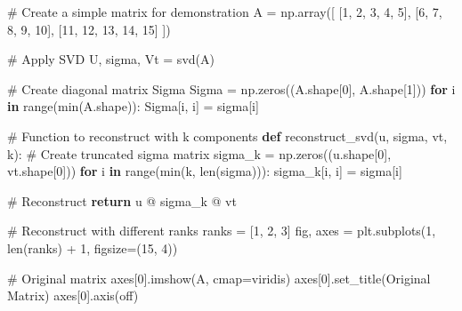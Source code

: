 \documentclass[
  letterpaper,
  DIV=11,
  numbers=noendperiod]{scrreprt}
\newenvironment{Shaded}{\begin{snugshade}}{\end{snugshade}}
\newcommand{\BuiltInTok}[1]{\textcolor[rgb]{0.00,0.23,0.31}{#1}}
\newcommand{\CommentTok}[1]{\textcolor[rgb]{0.37,0.37,0.37}{#1}}
\newcommand{\ControlFlowTok}[1]{\textcolor[rgb]{0.00,0.23,0.31}{\textbf{#1}}}
\newcommand{\DecValTok}[1]{\textcolor[rgb]{0.68,0.00,0.00}{#1}}
\newcommand{\KeywordTok}[1]{\textcolor[rgb]{0.00,0.23,0.31}{\textbf{#1}}}
\newcommand{\NormalTok}[1]{\textcolor[rgb]{0.00,0.23,0.31}{#1}}
\newcommand{\OperatorTok}[1]{\textcolor[rgb]{0.37,0.37,0.37}{#1}}
\newcommand{\StringTok}[1]{\textcolor[rgb]{0.13,0.47,0.30}{#1}}
\begin{document}
\begin{Shaded}
\begin{Highlighting}[]
\CommentTok{\# Create a simple matrix for demonstration}
\NormalTok{A }\OperatorTok{=}\NormalTok{ np.array([}
\NormalTok{    [}\DecValTok{1}\NormalTok{, }\DecValTok{2}\NormalTok{, }\DecValTok{3}\NormalTok{, }\DecValTok{4}\NormalTok{, }\DecValTok{5}\NormalTok{],}
\NormalTok{    [}\DecValTok{6}\NormalTok{, }\DecValTok{7}\NormalTok{, }\DecValTok{8}\NormalTok{, }\DecValTok{9}\NormalTok{, }\DecValTok{10}\NormalTok{],}
\NormalTok{    [}\DecValTok{11}\NormalTok{, }\DecValTok{12}\NormalTok{, }\DecValTok{13}\NormalTok{, }\DecValTok{14}\NormalTok{, }\DecValTok{15}\NormalTok{]}
\NormalTok{])}

\CommentTok{\# Apply SVD}
\NormalTok{U, sigma, Vt }\OperatorTok{=}\NormalTok{ svd(A)}

\CommentTok{\# Create diagonal matrix Sigma}
\NormalTok{Sigma }\OperatorTok{=}\NormalTok{ np.zeros((A.shape[}\DecValTok{0}\NormalTok{], A.shape[}\DecValTok{1}\NormalTok{]))}
\ControlFlowTok{for}\NormalTok{ i }\KeywordTok{in} \BuiltInTok{range}\NormalTok{(}\BuiltInTok{min}\NormalTok{(A.shape)):}
\NormalTok{    Sigma[i, i] }\OperatorTok{=}\NormalTok{ sigma[i]}

\CommentTok{\# Function to reconstruct with k components}
\KeywordTok{def}\NormalTok{ reconstruct\_svd(u, sigma, vt, k):}
    \CommentTok{\# Create truncated sigma matrix}
\NormalTok{    sigma\_k }\OperatorTok{=}\NormalTok{ np.zeros((u.shape[}\DecValTok{0}\NormalTok{], vt.shape[}\DecValTok{0}\NormalTok{]))}
    \ControlFlowTok{for}\NormalTok{ i }\KeywordTok{in} \BuiltInTok{range}\NormalTok{(}\BuiltInTok{min}\NormalTok{(k, }\BuiltInTok{len}\NormalTok{(sigma))):}
\NormalTok{        sigma\_k[i, i] }\OperatorTok{=}\NormalTok{ sigma[i]}
    
    \CommentTok{\# Reconstruct}
    \ControlFlowTok{return}\NormalTok{ u }\OperatorTok{@}\NormalTok{ sigma\_k }\OperatorTok{@}\NormalTok{ vt}

\CommentTok{\# Reconstruct with different ranks}
\NormalTok{ranks }\OperatorTok{=}\NormalTok{ [}\DecValTok{1}\NormalTok{, }\DecValTok{2}\NormalTok{, }\DecValTok{3}\NormalTok{]}
\NormalTok{fig, axes }\OperatorTok{=}\NormalTok{ plt.subplots(}\DecValTok{1}\NormalTok{, }\BuiltInTok{len}\NormalTok{(ranks) }\OperatorTok{+} \DecValTok{1}\NormalTok{, figsize}\OperatorTok{=}\NormalTok{(}\DecValTok{15}\NormalTok{, }\DecValTok{4}\NormalTok{))}

\CommentTok{\# Original matrix}
\NormalTok{axes[}\DecValTok{0}\NormalTok{].imshow(A, cmap}\OperatorTok{=}\StringTok{\textquotesingle{}viridis\textquotesingle{}}\NormalTok{)}
\NormalTok{axes[}\DecValTok{0}\NormalTok{].set\_title(}\StringTok{\textquotesingle{}Original Matrix\textquotesingle{}}\NormalTok{)}
\NormalTok{axes[}\DecValTok{0}\NormalTok{].axis(}\StringTok{\textquotesingle{}off\textquotesingle{}}\NormalTok{)}


\end{Highlighting}
\end{Shaded}
\end{document}
